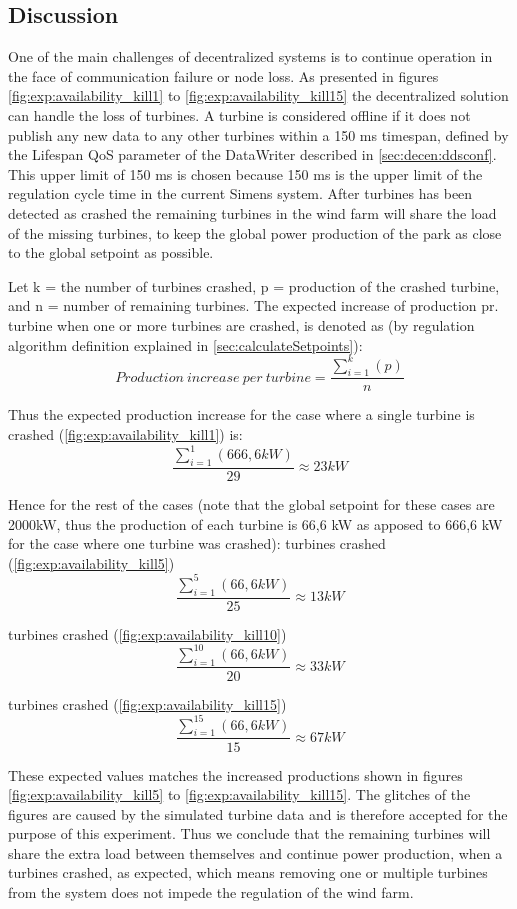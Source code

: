 \FloatBarrier
\subsection{Discussion}
One of the main challenges of decentralized systems is to continue operation in the face of communication failure or node loss. As presented in figures \ref{fig:exp:availability_kill1} to \ref{fig:exp:availability_kill15} the decentralized solution can handle the loss of turbines. A turbine is considered offline if it does not publish any new data to any other turbines within a 150 ms timespan, defined by the Lifespan QoS parameter of the DataWriter described in \cref{sec:decen:ddsconf}.
This upper limit of 150 ms is chosen because 150 ms is the upper limit of the regulation cycle time in the current Simens system.
After turbines has been detected as crashed the remaining turbines in the wind farm will share the load of the missing turbines, to keep the global power production of the park as close to the global setpoint as possible.

Let k = the number of turbines crashed, p = production of the crashed turbine, and n = number of remaining turbines. The expected increase of production pr. turbine when one or more turbines are crashed, is denoted as (by regulation algorithm definition explained in \cref{sec:calculateSetpoints}): $$Production~increase~per~turbine = \frac{\sum\limits_{i=1}^k(p)}{n}$$

Thus the expected production increase for the case where a single turbine is crashed (\cref{fig:exp:availability_kill1}) is: $$\frac{\sum\limits_{i=1}^1(666,6kW)}{29}\approx23kW$$

Hence for the rest of the cases (note that the global setpoint for these cases are 2000kW, thus the production of each turbine is 66,6 kW as apposed to 666,6 kW for the case where one turbine was crashed):
\newline\newline
{} turbines crashed (\cref{fig:exp:availability_kill5}) $$\frac{\sum\limits_{i=1}^5(66,6kW)}{25}\approx13kW$$

 turbines crashed (\cref{fig:exp:availability_kill10}) $$\frac{\sum\limits_{i=1}^{10}(66,6kW)}{20}\approx33kW$$

 turbines crashed (\cref{fig:exp:availability_kill15}) $$\frac{\sum\limits_{i=1}^{15}(66,6kW)}{15}\approx67kW$$

These expected values matches the increased productions shown in figures \ref{fig:exp:availability_kill5} to \ref{fig:exp:availability_kill15}. The glitches of the figures are caused by the simulated turbine data and is therefore accepted for the purpose of this experiment. Thus we conclude that the remaining turbines will share the extra load between themselves and continue power production, when a turbines crashed, as expected, which means removing one or multiple turbines from the system does not impede the regulation of the wind farm. 

